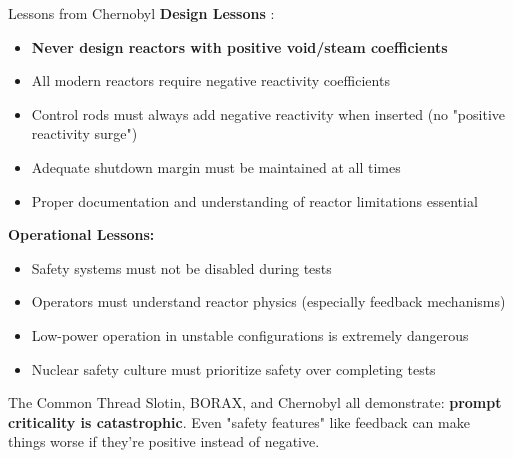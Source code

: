 \documentclass[aspectratio=169]{beamer}
\begin{document}
\begin{frame}[allowframebreaks]{Lessons from Chernobyl}
    \textbf{Design Lessons} \cite{malko2002chernobyl}:
    \begin{itemize}
        \item \textbf{Never design reactors with positive void/steam coefficients}
        \item All modern reactors require negative reactivity coefficients
        \item Control rods must always add negative reactivity when inserted (no "positive reactivity surge")
        \item Adequate shutdown margin must be maintained at all times
        \item Proper documentation and understanding of reactor limitations essential
    \end{itemize}
    
    \vspace{0.5em}
    \textbf{Operational Lessons:}
    \begin{itemize}
        \item Safety systems must not be disabled during tests
        \item Operators must understand reactor physics (especially feedback mechanisms)
        \item Low-power operation in unstable configurations is extremely dangerous
        \item Nuclear safety culture must prioritize safety over completing tests
    \end{itemize}

    \vspace{0.5em}
    \begin{block}{The Common Thread}
        Slotin, BORAX, and Chernobyl all demonstrate: \textbf{prompt criticality is catastrophic}. Even "safety features" like feedback can make things worse if they're positive instead of negative.
    \end{block}
\end{frame}
\end{document}
